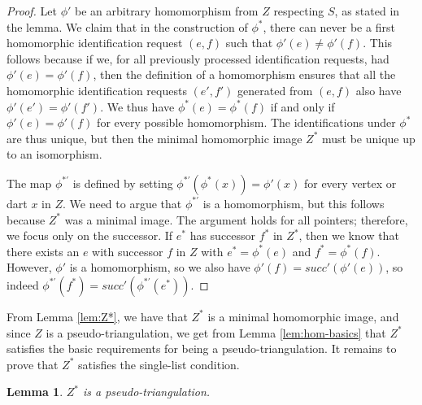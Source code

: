 \documentclass[10pt,a4paper]{article}
\newtheorem{lem}[thm]{Lemma}
\def\successor{\textit{succ}}
\begin{document}
\begin{proof}
Let $\phi'$ be an arbitrary homomorphism from $Z$ respecting $S$, as stated in the lemma.
We claim that in the construction of $\phi^*$, there can never 
be a first homomorphic identification request $(e,f)$ such that 
$\phi'(e)\neq \phi'(f)$. This follows because if we, for all previously processed identification requests, had
$\phi'(e)=\phi'(f)$, then the definition of a homomorphism ensures that all the homomorphic identification requests
$(e',f')$ generated from 
$(e,f)$ also have $\phi'(e')=\phi'(f')$.
We thus have $\phi^*(e)=\phi^*(f)$ if and only if $\phi'(e)=\phi'(f)$ for every possible homomorphism. The identifications under
$\phi^*$ are thus unique, but then the minimal homomorphic image $Z^*$ must be unique up to an isomorphism.

The map $\phi^{*\prime}$ is defined
by setting $\phi^{*\prime}(\phi^*(x))=\phi'(x)$ for every vertex or dart $x$ in $Z$.
We need to argue that $\phi^{*\prime}$ is a homomorphism, but this follows because $Z^*$ was a minimal image. The argument holds for all pointers; therefore, we focus only on the successor. If $e^*$ has
successor $f^*$ in $Z^*$, then we
know that there exists an $e$ with successor $f$ in $Z$ with $e^*=\phi^*(e)$ and $f^*=\phi^*(f)$. However,
$\phi'$ is a homomorphism, so we
also have $\phi'(f)=\successor'(\phi'(e))$, so
indeed $\phi^{*\prime}(f^*)=\successor'(\phi^{*\prime}(e^*))$.
\end{proof}
From Lemma \ref{lem:Z*}, we have that $Z^*$ is a minimal homomorphic image, and since $Z$ is a pseudo-triangulation, we get from
Lemma \ref{lem:hom-basics} that $Z^*$ satisfies the basic requirements for being a pseudo-triangulation. It remains to prove that $Z^*$ 
satisfies the single-list condition.
\begin{lem}\label{le:Z*-pseudo-triangulation}
 $Z^*$ is a pseudo-triangulation. 
\end{lem}
\end{document}

